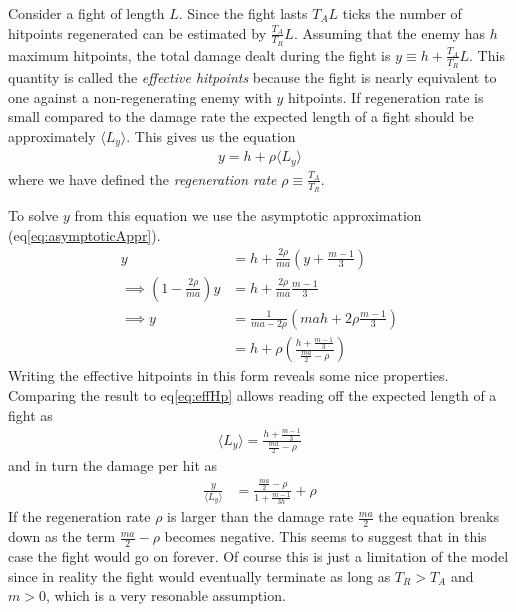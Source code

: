 Consider a fight of length $L$. Since the fight lasts $T_A L$ ticks the number of hitpoints regenerated can be estimated by $\frac{T_A}{T_R} L$. Assuming that the enemy has $h$ maximum hitpoints, the total damage dealt during the fight is $y \equiv h + \frac{T_A}{T_R} L$. This quantity is called the \textit{effective hitpoints} because the fight is nearly equivalent to one against a non-regenerating enemy with $y$ hitpoints. If regeneration rate is small compared to the damage rate the expected length of a fight should be approximately $\langle L_y \rangle$. This gives us the equation
\begin{align}\label{eq:effHp}
	y = h + \rho\langle L_y \rangle
\end{align}
where we have defined the \textit{regeneration rate} $\rho \equiv \frac{T_A}{T_R}$.

To solve $y$ from this equation we use the asymptotic approximation (eq\ref{eq:asymptoticAppr}).
\begin{align}
	y &= h + \frac{2\rho}{ma} \left(y + \frac{m-1}{3}\right)\nonumber\\
	\implies \left(1 - \frac{2\rho}{ma}\right) y &= h + \frac{2\rho}{ma} \frac{m-1}{3}\nonumber\\
	\implies y
		&= \frac{1}{ma - 2\rho}\left(mah + 2\rho \frac{m-1}{3}\right)\nonumber\\
		&= h + \rho\left(\frac{h + \frac{m-1}{3}}{\frac{ma}{2} - \rho}\right)
\end{align}
Writing the effective hitpoints in this form reveals some nice properties. Comparing the result to eq\ref{eq:effHp} allows reading off the expected length of a fight as
\begin{align}
	\langle L_y \rangle = \frac{h + \frac{m-1}{3}}{\frac{ma}{2} - \rho}
\end{align}
and in turn the damage per hit as
\begin{align}
	\frac{y}{\langle L_y \rangle}
		&= \frac{\frac{ma}{2} - \rho}{1 + \frac{m-1}{3h}} + \rho
\end{align}
If the regeneration rate $\rho$ is larger than the damage rate $\frac{ma}{2}$ the equation breaks down as the term $\frac{ma}{2} - \rho$ becomes negative. This seems to suggest that in this case the fight would go on forever. Of course this is just a limitation of the model since in reality the fight would eventually terminate as long as $T_R > T_A$ and $m > 0$, which is a very resonable assumption.
